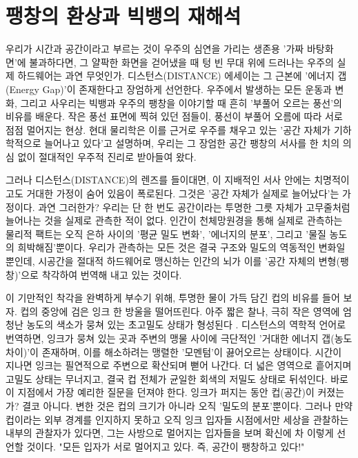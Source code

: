 

\section{팽창의 환상과 빅뱅의 재해석}
우리가 시간과 공간이라고 부르는 것이 우주의 심연을 가리는 생존용 '가짜 바탕화면'에 불과하다면, 그 얄팍한 화면을 걷어냈을 때 텅 빈 무대 위에 드러나는 우주의 실제 하드웨어는 과연 무엇인가.
디스턴스(DISTANCE) 에세이는 그 근본에 '에너지 갭(Energy Gap)'이 존재한다고 장엄하게 선언한다. 우주에서 발생하는 모든 운동과 변화, 그리고 사우리는 빅뱅과 우주의 팽창을 이야기할 때 흔히 '부풀어 오르는 풍선'의 비유를 배운다. 작은 풍선 표면에 찍혀 있던 점들이, 풍선이 부풀어 오름에 따라 서로 점점 멀어지는 현상. 현대 물리학은 이를 근거로 우주를 채우고 있는 '공간 자체가 기하학적으로 늘어나고 있다'고 설명하며, 우리는 그 장엄한 공간 팽창의 서사를 한 치의 의심 없이 절대적인 우주적 진리로 받아들여 왔다.

그러나 디스턴스(DISTANCE)의 렌즈를 들이대면, 이 지배적인 서사 안에는 치명적이고도 거대한 가정이 숨어 있음이 폭로된다. 그것은 '공간 자체가 실제로 늘어났다'는 가정이다. 과연 그러한가? 우리는 단 한 번도 공간이라는 투명한 그릇 자체가 고무줄처럼 늘어나는 것을 실제로 관측한 적이 없다. 인간이 천체망원경을 통해 실제로 관측하는 물리적 팩트는 오직 은하 사이의 '평균 밀도 변화', '에너지의 분포', 그리고 '물질 농도의 희박해짐'뿐이다. 우리가 관측하는 모든 것은 결국 구조와 밀도의 역동적인 변화일 뿐인데, 시공간을 절대적 하드웨어로 맹신하는 인간의 뇌가 이를 '공간 자체의 변형(팽창)'으로 착각하여 번역해 내고 있는 것이다.

이 기만적인 착각을 완벽하게 부수기 위해, 투명한 물이 가득 담긴 컵의 비유를 들어 보자. 컵의 중앙에 검은 잉크 한 방울을 떨어뜨린다. 아주 짧은 찰나, 극히 작은 영역에 엄청난 농도의 색소가 뭉쳐 있는 초고밀도 상태가 형성된다
. 디스턴스의 역학적 언어로 번역하면, 잉크가 뭉쳐 있는 곳과 주변의 맹물 사이에 극단적인 '거대한 에너지 갭(농도 차이)'이 존재하며, 이를 해소하려는 맹렬한 '모멘텀'이 끓어오르는 상태이다.
시간이 지나면 잉크는 필연적으로 주변으로 확산되며 뻗어 나간다. 더 넓은 영역으로 흩어지며 고밀도 상태는 무너지고, 결국 컵 전체가 균일한 회색의 저밀도 상태로 뒤섞인다. 바로 이 지점에서 가장 예리한 질문을 던져야 한다. 잉크가 퍼지는 동안 컵(공간)이 커졌는가? 결코 아니다. 변한 것은 컵의 크기가 아니라 오직 '밀도의 분포'뿐이다. 그러나 만약 컵이라는 외부 경계를 인지하지 못하고 오직 잉크 입자들 시점에서만 세상을 관찰하는 내부의 관찰자가 있다면, 그는 사방으로 멀어지는 입자들을 보며 확신에 차 이렇게 선언할 것이다. "모든 입자가 서로 멀어지고 있다. 즉, 공간이 팽창하고 있다!"

